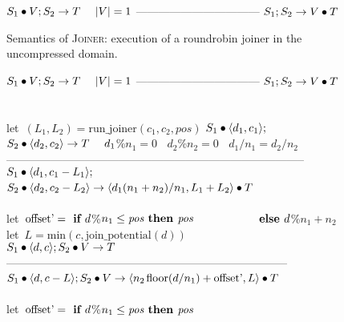 \begin{figure}[t]
$S_1 \bullet V; S_2 \rightarrow T~~~~|V|=1$\skiptopb
---------------------------------\skipbot
$S_1; S_2 \rightarrow V \bullet T$
\caption{Semantics of \textsc{Joiner}: execution of a roundrobin
  joiner in the uncompressed domain.
\protect\label{fig:uncompressed-joiner}}
\end{figure}

\begin{figure}[t]
$S_1 \bullet V; S_2 \rightarrow T~~~~|V|=1$\skiptopb
---------------------------------\skipbot
$S_1; S_2 \rightarrow V \bullet T$
~ \\ ~ \\
let~$(L_1, L_2) = \mbox{run\_joiner}(c_1, c_2, pos)$\skiptopb
$S_1 \bullet \langle d_1, c_1\rangle;$\\
$S_2 \bullet \langle d_2, c_2\rangle \rightarrow T~~~~d_1$\%$n_1=0~~~~d_2$\%$n_2=0~~~~d_1/n_1=d_2/n_2$\vspace{-3pt}\skiptopa
--------------------------------------------------------------------------------\skipbot
$S_1 \bullet \langle d_1, c_1-L_1\rangle;$\\
$S_2 \bullet \langle d_2, c_2-L_2\rangle \rightarrow \langle d_1(n_1+n_2)/n_1, L_1+L_2\rangle \bullet T$
~ \\ ~ \\
let~$\mbox{offset'} = \mbox{\bf ~if~} d$\%$n_1 \leq \mbox{\it pos} \mbox{\bf ~then~} \mbox{\it pos}$\skiptopb
$\mbox{~~~~}\hspace{37.7pt}\mbox{\bf ~else~} d$\%$n_1 + n_2$\\
let~$L=\mbox{min}(c,\mbox{join\_potential}(d))$\\
$S_1 \bullet \langle d, c\rangle; S_2 \bullet V \rightarrow T$\vspace{-3pt}\skiptopa
---------------------------------------------------------------------------\skipbot
$S_1 \bullet \langle d, c-L\rangle; S_2 \bullet V \rightarrow \langle n_2{\hspace{1.3pt}}\mbox{floor}(d/n_1) + \mbox{offset'}, L\rangle \bullet T$
~ \\ ~ \\
let~$\mbox{offset'} = \mbox{\bf ~if~} d$\%$n_1 \leq \mbox{\it pos} \mbox{\bf ~then~} \mbox{\it pos}$\skiptopb

\end{figure}
